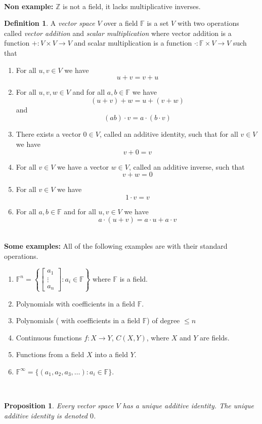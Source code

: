 \documentclass[12pt,letterpaper]{amsart}
\theoremstyle{plain}
\newtheorem{proposition}{Proposition}[section]
\theoremstyle{definition}
\newtheorem{definition}[theorem]{Definition}
\numberwithin{equation}{section}
\begin{document}
\ \\
{\bf Non example: }$\mathbb{Z}$ is not a field, it lacks multiplicative inverses. 
\ \\
\begin{definition} A \emph{vector space} $V$ over a field $\mathbb{F}$ is a set $V$ with two operations called \emph{vector addition} and \emph{scalar multiplication} where vector addition is a function $+:V\times V\rightarrow V$ and scalar multiplication is a function $\cdot: \mathbb{F}\times V\rightarrow V$ such that 
\\
\begin{enumerate}[1.] 
\setlength{\itemsep}{5pt}
\item For all $u,v\in V$ we have 
\[u+v=v+u\]
\item For all $u,v,w\in V$ and for all $a,b\in\mathbb{F}$ we have 
\[(u+v)+w=u+(v+w)\]
and 
\[(ab)\cdot v=a\cdot(b\cdot v)\]
\item There exists a vector $0\in V$, called an additive identity, such that for all $v\in V$ we have
\[v+0=v\]

\item For all $v\in V$ we have a vector $w\in V$, called an additive inverse, such that 
\[v+w=0\]
\item For all $v\in V$ we have 
\[1\cdot v=v\]
\item For all $a,b \in \mathbb{F}$ and for all $u,v\in V$ we have
\[a\cdot(u+v)=a\cdot u+a\cdot v\] 
\end{enumerate}
\end{definition}
\ \\
{\bf \noindent Some examples:} All of the following examples are with their standard operations. 
\begin{enumerate}[1.]
\setlength{\itemsep}{5pt}
\item $\mathbb{F}^n=\left\{\begin{bmatrix}a_1\\ \vdots \\ a_n\end{bmatrix}: a_i\in \mathbb{F}\right\}$ where $\mathbb{F}$ is a field. 
\item Polynomials with coefficients in a field $\mathbb{F}$.
\item Polynomials ( with coefficients in a field $\mathbb{F}$) of degree $\leq n$
\item Continuous functions $f:X\rightarrow Y$, $C(X,Y)$, where $X$ and $Y$ are fields. 
\item Functions from a field $X$ into a field $Y$. 
\item $\mathbb{F}^\infty=\{(a_1, a_2, a_3, \ldots): a_i\in \mathbb{F}\}$. 
\end{enumerate}
\ \\
\begin{proposition}Every vector space $V$ has a unique additive identity. The unique additive identity is denoted $0$. 
\end{proposition}
\end{document}
